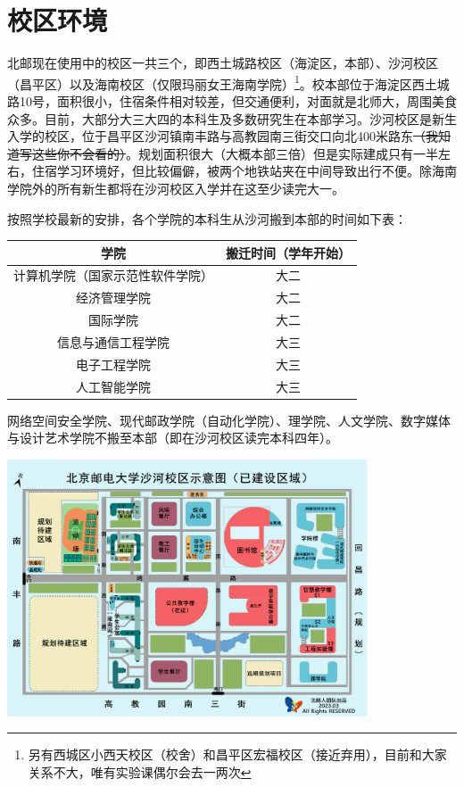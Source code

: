 \section{校区环境}

北邮现在使用中的校区一共三个，即西土城路校区（海淀区，本部）、沙河校区（昌平区）以及海南校区（仅限玛丽女王海南学院）\footnote{另有西城区小西天校区（校舍）和昌平区宏福校区（接近弃用），目前和大家关系不大，唯有实验课偶尔会去一两次}。校本部位于海淀区西土城路10号，面积很小，住宿条件相对较差，但交通便利，对面就是北师大，周围美食众多。目前，大部分大三大四的本科生及多数研究生在本部学习。沙河校区是新生入学的校区，位于昌平区沙河镇南丰路{\small{}与高教园南三街交口向北400米路东\sout{（我知道写这些你不会看的）}}。规划面积很大（大概本部三倍）但是实际建成只有一半左右，住宿学习环境好，但比较偏僻，被两个地铁站夹在中间导致出行不便。除海南学院外的所有新生都将在沙河校区入学并在这至少读完大一。

按照学校最新的安排，各个学院的本科生从沙河搬到本部的时间如下表：

\begin{center}
    \begin{tabular}{cc}
        \toprule
        学院 & 搬迁时间（学年开始） \\
        \midrule
        计算机学院（国家示范性软件学院） & 大二 \\
        经济管理学院 & 大二 \\
        国际学院 & 大二\\
        信息与通信工程学院 & 大三 \\
        电子工程学院 & 大三 \\
        人工智能学院 & 大三 \\
        \bottomrule
    \end{tabular}
\end{center}

网络空间安全学院、现代邮政学院（自动化学院）、理学院、人文学院、数字媒体与设计艺术学院不搬至本部（即在沙河校区读完本科四年）。

\begin{center}
    \includegraphics[width=0.80\textwidth]{images/shahe-map.jpg}
\end{center}


